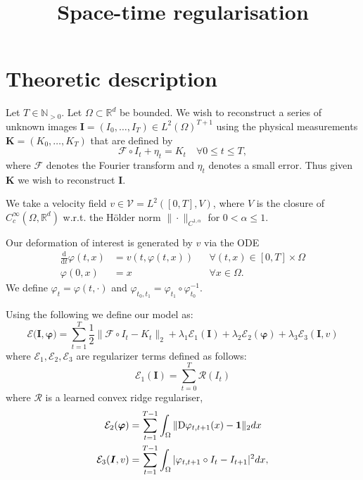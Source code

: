 \documentclass{article}
\title{Space-time regularisation}
\begin{document}
\maketitle

\section{Theoretic description}\label{sec:theory}

Let $T\in \mathbb{N}_{>0}$. Let $\Omega\subset\mathbb{R}^d$ be bounded. We wish to reconstruct a series of unknown images $\boldsymbol{I}=(I_0, \ldots, I_T)\in L^2(\Omega)^{T+1}$ using the physical measurements $\boldsymbol{K}=(K_0, \ldots, K_T)$ that are defined by
\begin{equation*}
    \mathcal{F}\circ I_t + \eta_t = K_t \quad\forall 0\le t\le T,
\end{equation*}
where $\mathcal{F}$ denotes the Fourier transform and $\eta_t$ denotes a small error. Thus given $\boldsymbol{K}$ we wish to reconstruct $\boldsymbol{I}$.

We take a velocity field $v\in \mathcal{V}=L^2([0,T], V)$, where $V$ is the closure of $C_c^\infty(\Omega, \mathbb{R}^d)$ w.r.t. the Hölder norm $\|\cdot\|_{C^{1,\alpha}}$ for $0<\alpha\le 1$.

Our deformation of interest is generated by $v$ via the ODE
\begin{align*}
    \frac{\text{d}}{\text{d}t}\varphi(t,x)&= v(t, \varphi(t,x)) & &\forall(t,x)\in [0,T]\times\Omega\\
    \varphi(0,x)&=x & &\forall x\in\Omega.
\end{align*}
We define $\varphi_t=\varphi(t,\cdot)$ and $\varphi_{t_0,t_1}=\varphi_{t_1}\circ\varphi_{t_0}^{-1}$.

Using the following we define our model as:
\begin{equation}\label{energy}
    \mathcal{E}(\boldsymbol{I}, \boldsymbol{\varphi)} = \sum_{t=1}^T \frac12 \|\mathcal{F}\circ I_t - K_t\|_2 + \lambda_1 \mathcal{E}_1(\boldsymbol{I}) + \lambda_2 \mathcal{E}_2 (\boldsymbol{\varphi}) + \lambda_3\mathcal{E}_3 (\boldsymbol{I}, v)
\end{equation}
where $\mathcal{E}_1, \mathcal{E}_2, \mathcal{E}_3$ are regularizer terms defined as follows:
\begin{equation*}
    \mathcal{E}_1(\boldsymbol{I}) = \sum_{t=0}^T \mathcal{R}(I_t)
\end{equation*}
where $\mathcal{R}$ is a learned convex ridge regulariser,
\begin{align*}
    \mathcal{E}_2(\boldsymbol{\varphi}) &= \sum_{t=1}^{T-1}\int_\Omega \|\text{D}\varphi_{t,t+1}(x) - \bold{1}\|_2 dx \\
    \mathcal{E}_3(\boldsymbol{I}, v) &= \sum_{t=1}^{T-1}\int_\Omega |\varphi_{t,t+1}\circ I_t - I_{t+1}|^2dx,
\end{align*}
\end{document}
